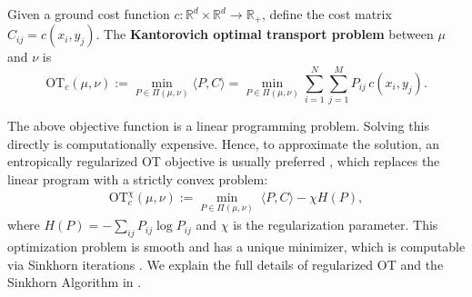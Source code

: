 Given a ground cost function $c:\mathbb{R}^d \times \mathbb{R}^d \to \mathbb{R}_+$, define the cost matrix $C_{ij} = c(x_i, y_j)$. The \textbf{Kantorovich optimal transport problem} \citep{peyre2020computationaloptimaltransport} between $\mu$ and $\nu$ is
\begin{equation}
  \mathrm{OT}_c(\mu, \nu) := \min_{P \in \Pi(\mu,\nu)} \langle P, C \rangle
  = \min_{P \in \Pi(\mu,\nu)} \sum_{i=1}^N \sum_{j=1}^M P_{ij}\, c(x_i, y_j).
  \label{eq:kantorovich-ot}
\end{equation}

The above objective function is a linear programming problem. Solving this directly is computationally expensive. Hence, to approximate the solution, an entropically regularized OT objective is usually preferred \citep{cuturi2013sinkhorn}, which replaces the linear program with a strictly convex problem:
\begin{align}
  \mathrm{OT}^{\chi}_{c}(\mu,\nu) := \min_{P\in \Pi(\mu,\nu)}\;\langle P,C\rangle - \chi H(P),\label{eq:ot-unreg}
\end{align}
where $H(P)=-\sum_{ij}P_{ij}\log P_{ij}$ and $\chi$ is the regularization parameter. This optimization problem is smooth and has a unique minimizer, which is computable via Sinkhorn iterations \citep{cuturi2013sinkhorn,peyre2020computationaloptimaltransport}. We explain the full details of regularized OT and the Sinkhorn Algorithm in .




